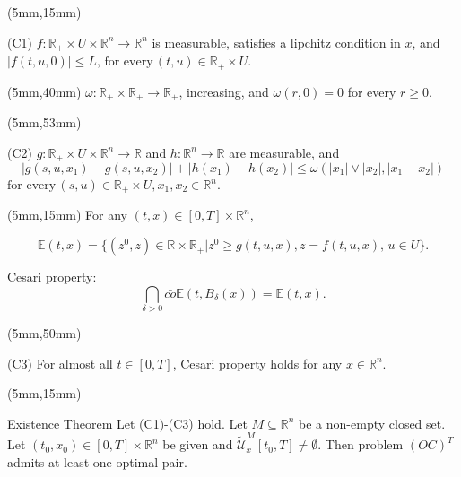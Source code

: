 \documentclass[10pt]{beamer}
\begin{document}
\begin{frame}
\begin{textblock*}{120mm}(5mm,15mm)
	\begin{graybox}{(C1)}
		$f:\mathbb{R}_{+}\times U\times \mathbb{R}^n\rightarrow \mathbb{R}^n$ is measurable, satisfies a lipchitz condition in $x$, and $|f(t,u,0)|\leq L,\,\mbox{for every}\,(t,u)\in \mathbb{R}_{+}\times U .$
				
	\end{graybox}
\end{textblock*}

\begin{textblock*}{120mm}(5mm,40mm)
	 $\omega:\mathbb{R}_{+}\times\mathbb{R}_{+}\rightarrow \mathbb{R}_{+}$, increasing, and $\omega(r,0)=0$ for every $r\geq 0$.
\end{textblock*}

\begin{textblock*}{120mm}(5mm,53mm)
	\begin{graybox}{(C2)}
		$g:\mathbb{R}_{+}\times U\times \mathbb{R}^n\rightarrow \mathbb{R}$ and $h:\mathbb{R}^n\rightarrow \mathbb{R}$ are measurable, and
		$$|g(s,u,x_1)-g(s,u,x_2)|+|h(x_1)-h(x_2)|\leq \omega(|x_1|\vee |x_2|,|x_1-x_2|)$$
		$\mbox{for every}\, (s,u)\in \mathbb{R}_{+}\times U,x_1,x_2\in \mathbb{R}^n$.
	\end{graybox}
\end{textblock*}
\end{frame}

\begin{frame}
	\begin{textblock*}{120mm}(5mm,15mm)
		For any $(t,x)\in [0,T]\times\mathbb{R}^n$,
		
		$$\mathbb{E}(t,x)=\{(z^0,z)\in \mathbb{R}\times \mathbb{R}_{+}|z^0\geq g(t,u,x),z=f(t,u,x),\, u\in U\}.$$
	
		Cesari property:
		$$\bigcap_{\delta>0}\bar{co}\mathbb{E}(t,B_{\delta}(x))=\mathbb{E}(t,x).$$
	\end{textblock*}



	\begin{textblock*}{120mm}(5mm,50mm)
		\begin{graybox}{(C3)}
			For almost all $t\in[0,T]$, Cesari property holds for any $x\in \mathbb{R}^n$.
		\end{graybox}
	\end{textblock*}
\end{frame}


\begin{frame}
	\begin{textblock*}{120mm}(5mm,15mm)
		\begin{graybox}{Existence Theorem}
			Let (C1)-(C3) hold. Let $M\subseteq \mathbb{R}^n$ be a non-empty closed set. Let $(t_0,x_0)\in [0,T]\times\mathbb{R}^n$ be given and $\tilde{\mathcal{U}}^M_x[t_0,T]\neq\emptyset$. Then problem $(OC)^T$ admits at least one optimal pair.
		\end{graybox}
	\end{textblock*}
\end{frame}
\end{document}

